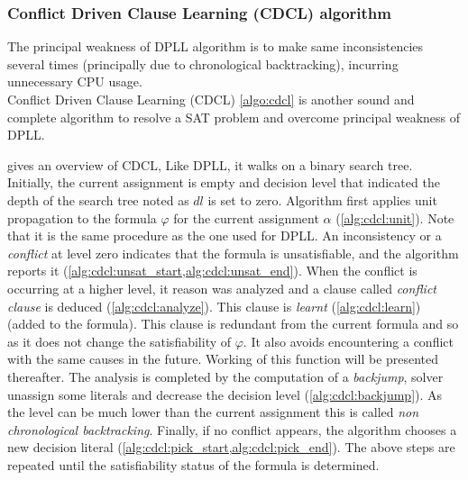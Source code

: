 %
%
\subsubsection{Conflict Driven Clause Learning (CDCL) algorithm}\label{sec:cdcl}
The principal weakness of DPLL algorithm is to make same inconsistencies several times
(principally due to chronological backtracking), incurring unnecessary CPU usage.\\
Conflict Driven Clause Learning (CDCL) \cref{algo:cdcl} is another sound and complete algorithm
to resolve a SAT problem and overcome principal weakness of DPLL.

 gives an overview of CDCL, Like DPLL,  it walks on a binary search tree.
Initially, the current assignment is empty and decision level that indicated the depth of the search tree noted as $dl$ is set to zero.
Algorithm first applies unit propagation to the formula $\varphi$ for the current assignment $\alpha$ (\cref{alg:cdcl:unit}).
Note that it is  the same procedure as the one used for DPLL.
An inconsistency or a \emph{conflict} at level zero indicates that the formula is unsatisfiable, and the algorithm
reports it (\cref{alg:cdcl:unsat_start,alg:cdcl:unsat_end}). When the conflict is occurring at a higher level, it
reason was analyzed and a clause called \emph{conflict clause} is deduced (\cref{alg:cdcl:analyze}).
This clause is \emph{learnt} (\cref{alg:cdcl:learn}) (added to the formula). This clause is redundant from the current
formula and so as it does not change the satisfiability of $\varphi$. It also avoids encountering a conflict with the same
causes in the future. Working of this function will be presented thereafter.
The analysis is completed by the computation of a \emph{backjump}, solver unassign some literals and decrease
the decision level (\cref{alg:cdcl:backjump}). As the level can be much lower than the current assignment this is called 
\emph{non chronological backtracking}.
Finally, if no conflict appears, the algorithm chooses a new decision literal 
(\cref{alg:cdcl:pick_start,alg:cdcl:pick_end}).
The above steps are repeated until the satisfiability status of the
formula is determined.

